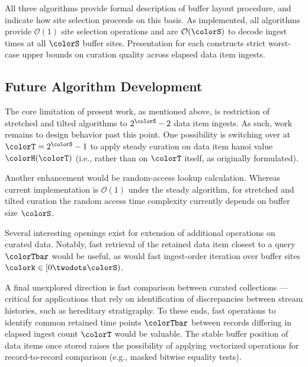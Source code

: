 All three algorithms provide formal description of buffer layout procedure, and indicate how site selection proceeds on this basis.
As implemented, all algorithms provide $\mathcal{O}(1)$ site selection operations and are $\mathcal{O}(\colorS)$ to decode ingest times at all $\colorS$ buffer sites.
Presentation for each constructs strict worst-case upper bounds on curation quality across elapsed data item ingests.

\subsection{Future Algorithm Development}

The core limitation of present work, as mentioned above, is restriction of stretched and tilted algorithms to $2^{\colorS} - 2$ data item ingests.
As such, work remains to design behavior past this point.
One possibility is switching over at $\colorT = 2^{\colorS} - 1$ to apply steady curation on data item hanoi value $\colorH(\colorT)$ (i.e., rather than on $\colorT$ itself, as originally formulated).

Another enhancement would be random-access lookup calculation.
Whereas current implementation is $\mathcal{O}(1)$ under the steady algorithm, for stretched and tilted curation the random access time complexity currently depends on buffer size $\colorS$.

Several interesting openings exist for extension of additional operations on curated data.
Notably, fast retrieval of the retained data item closest to a query $\colorTbar$ would be useful, as would fast ingest-order iteration over buffer sites $\colork \in [0 \twodots \colorS)$.

A final unexplored direction is fast comparison between curated collections --- critical for applications that rely on identification of discrepancies between stream histories, such as hereditary stratigraphy.
To these ends, fast operations to identify common retained time points $\colorTbar$ between records differing in elapsed ingest count $\colorT$ would be valuable.
The stable buffer position of data items once stored raises the possibility of applying vectorized operations for record-to-record comparison (e.g., masked bitwise equality tests).


